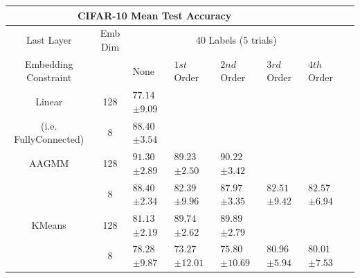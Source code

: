 \documentclass[10pt,twocolumn,letterpaper]{article}
\begin{document}
\begin{table}[ht!]
	\begin{tabularx}{\textwidth}{c|c|XXXXXX}
		\multicolumn{6}{c}{CIFAR-10 Mean Test Accuracy} \\ \hline\hline
		Last Layer &   Emb Dim   & \multicolumn{5}{c}{40 Labels (5 trials)}            \\ 
		\hline
		Embedding Constraint  &  & None & $1st$ Order & $2nd$ Order & $3rd$ Order & $4th$ Order  \\ 
		\hline
		Linear & 128  & $77.14$ \scriptsize{$\pm 9.09$}   &  &  &  &   \\
		(i.e. FullyConnected) & 8  & $88.40$ \scriptsize{$\pm 3.54$}      &  &  &  &   \\
		\hline
		AAGMM & 128  & $\boldsymbol{91.30}$ \scriptsize{$\pm 2.89$}    & $89.23$ \scriptsize{$\pm 2.50$} & $90.22$ \scriptsize{$\pm 3.42$} &  &  \\
		& 8  & $88.40$ \scriptsize{$\pm 2.34$}    & $82.39$ \scriptsize{$\pm 9.96$} & $87.97$ \scriptsize{$\pm 3.35$} & $82.51$ \scriptsize{$\pm 9.42$} & $82.57$ \scriptsize{$\pm 6.94$} \\
		\hline
		KMeans & 128  & $81.13$ \scriptsize{$\pm 2.19$}    & $89.74$ \scriptsize{$\pm 2.62$} & $\boldsymbol{89.89}$ \scriptsize{$\pm 2.79$} &  &  \\
		& 8  & $78.28$ \scriptsize{$\pm 9.87$}    & $73.27$ \scriptsize{$\pm 12.01$} & $75.80$ \scriptsize{$\pm 10.69$} & $80.96$ \scriptsize{$\pm 5.94$} & $80.01$ \scriptsize{$\pm 7.53$}  \\
		

\end{tabularx}
\end{table}
\end{document}
